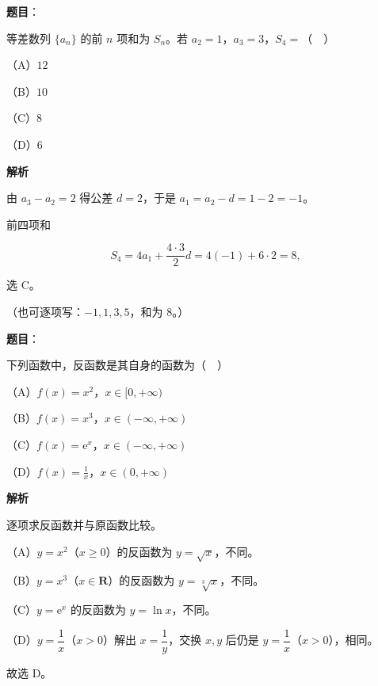 \begin{answer}

\textbf{题目}：

等差数列 $\{a_n\}$ 的前 $n$ 项和为 $S_n$。若 $a_2=1$，$a_3=3$，$S_4=$（　）

（A）$12$

（B）$10$

（C）$8$

（D）$6$

\textbf{解析}

由 $a_3-a_2=2$ 得公差 $d=2$，于是 $a_1=a_2-d=1-2=-1$。

前四项和

\nopagebreak[4]
\[S_4=4a_1+\frac{4\cdot3}{2}d=4(-1)+6\cdot2=8,\]

选 C。

（也可逐项写：$-1,1,3,5$，和为 $8$。）


\end{answer}
\begin{answer}

\textbf{题目}：

下列函数中，反函数是其自身的函数为（　）

（A）$f(x)=x^2$，$x\in[0,+\infty)$

（B）$f(x)=x^3$，$x\in(-\infty,+\infty)$

（C）$f(x)=\mathrm e^x$，$x\in(-\infty,+\infty)$

（D）$f(x)=\frac1x$，$x\in(0,+\infty)$

\textbf{解析}

逐项求反函数并与原函数比较。

（A）$y=x^2$（$x\geqslant0$）的反函数为 $y=\sqrt x$，不同。

（B）$y=x^3$（$x\in\mathbf R$）的反函数为 $y=\sqrt[3]x$，不同。

（C）$y=\mathrm e^x$ 的反函数为 $y=\ln x$，不同。

（D）$y=\dfrac1x$（$x>0$）解出 $x=\dfrac1y$，交换 $x,y$ 后仍是 $y=\dfrac1x$（$x>0$），相同。

故选 D。


\end{answer}
